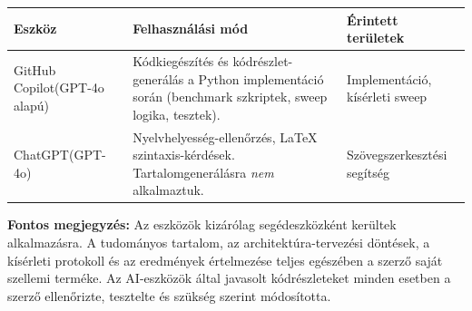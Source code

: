 \documentclass[
]{elteikthesis}[2024/04/26]
\begin{document}
\begin{center}
\begin{tabular}{|p{3.5cm}|p{5.5cm}|p{4.5cm}|}
\hline
\textbf{Eszköz} & \textbf{Felhasználási mód} & \textbf{Érintett területek} \\
\hline
GitHub Copilot\newline(GPT-4o alapú) &
Kódkiegészítés és kódrészlet-generálás a Python implementáció során
(benchmark szkriptek, sweep logika, tesztek). &
Implementáció, kísérleti sweep \\
\hline
ChatGPT\newline(GPT-4o) &
Nyelvhelyesség-ellenőrzés, \LaTeX{} szintaxis-kérdések.
Tartalomgenerálásra \emph{nem} alkalmaztuk. &
Szövegszerkesztési segítség \\
\hline
\end{tabular}
\end{center}

\bigskip
\noindent
\textbf{Fontos megjegyzés:} Az eszközök kizárólag segédeszközként kerültek
alkalmazásra. A tudományos tartalom, az architektúra-tervezési döntések, a
kísérleti protokoll és az eredmények értelmezése teljes egészében a szerző
saját szellemi terméke. Az AI-eszközök által javasolt kódrészleteket minden
esetben a szerző ellenőrizte, tesztelte és szükség szerint módosította.

{}
\printbibliography[title=\biblabel]
\cleardoublepage

{}
\listoffigures
\cleardoublepage

\end{document}

